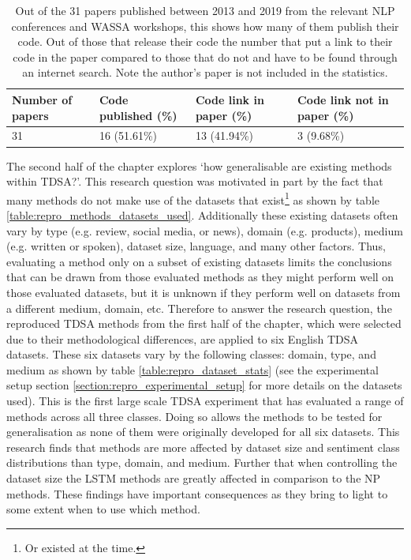 \begin{table}[!h]
    \centering
    \begin{tabular}{|p{}|p{}|p{}|p{}|}
    \hline
         Number of papers & Code published (\%) &	Code link in paper (\%) &	Code link not in paper (\%)  \\
         \hline
         31 & 16 (51.61\%) & 13 (41.94\%) &	3 (9.68\%) \\
    \hline
    \end{tabular}
    \caption{Out of the 31 papers published between 2013 and 2019 from the relevant NLP conferences and WASSA workshops, this shows how many of them publish their code. Out of those that release their code the number that put a link to their code in the paper compared to those that do not and have to be found through an internet search. Note the author's paper \cite{moore-rayson-2018-bringing} is not included in the statistics.}
    \label{table:repro_papers_stats}
\end{table}

The second half of the chapter explores  `how generalisable are existing methods within TDSA?'. This research question was motivated in part by the fact that many methods do not make use of the datasets that exist\footnote{Or existed at the time.} as shown by table \ref{table:repro_methods_datasets_used}. Additionally these existing datasets often vary by type (e.g. review, social media, or news), domain (e.g. products), medium (e.g. written or spoken), dataset size, language, and many other factors. Thus, evaluating a method only on a subset of existing datasets limits the conclusions that can be drawn from those evaluated methods as they might perform well on those evaluated datasets, but it is unknown if they perform well on datasets from a different medium, domain, etc. Therefore to answer the research question, the reproduced TDSA methods from the first half of the chapter, which were selected due to their methodological differences, are applied to six English TDSA datasets. These six datasets vary by the following classes: domain, type, and medium as shown by table \ref{table:repro_dataset_stats} (see the experimental setup section \ref{section:repro_experimental_setup} for more details on the datasets used). This is the first large scale TDSA experiment that has evaluated a range of methods across all three classes. Doing so allows the methods to be tested for generalisation as none of them were originally developed for all six datasets. This research finds that methods are more affected by dataset size and sentiment class distributions than type, domain, and medium. Further that when controlling the dataset size the LSTM methods are greatly affected in comparison to the NP methods. These findings have important consequences as they bring to light to some extent when to use which method.  


